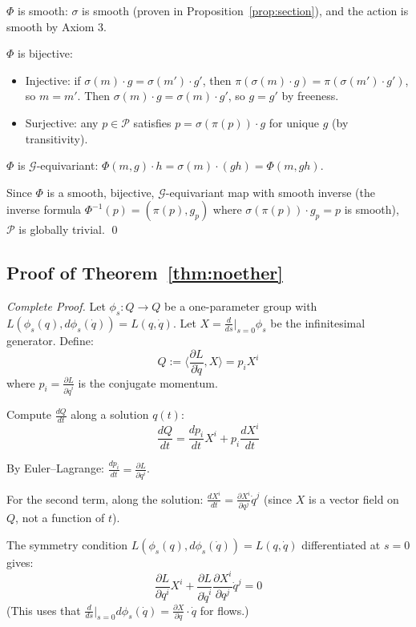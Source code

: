 \documentclass[11pt]{article}
\begin{document}
$\Phi$ is smooth: $\sigma$ is smooth (proven in Proposition~\ref{prop:section}), and the action is smooth by Axiom
3.

$\Phi$ is bijective:
\begin{itemize}
    \item Injective: if $\sigma(m) \cdot g = \sigma(m') \cdot g'$, then $\pi(\sigma(m) \cdot g) = \pi(\sigma(m') \cdot g')$, so $m = m'$. Then $\sigma(m) \cdot g = \sigma(m) \cdot g'$, so $g = g'$ by freeness.
    \item Surjective: any $p \in \mathcal{P}$ satisfies $p = \sigma(\pi(p)) \cdot g$ for unique $g$ (by transitivity).
\end{itemize}

$\Phi$ is $\mathcal{G}$-equivariant: $\Phi(m, g) \cdot h = \sigma(m) \cdot (gh) = \Phi(m, gh)$.

Since $\Phi$ is a smooth, bijective, $\mathcal{G}$-equivariant map with smooth inverse (the inverse formula
$\Phi^{-1}(p) = (\pi(p), g_p)$ where $\sigma(\pi(p)) \cdot g_p = p$ is smooth), $\mathcal{P}$ is globally trivial.
\qed

\subsection{Proof of Theorem~\ref{thm:noether}}

\textit{Complete Proof.} Let $\phi_s : Q \to Q$ be a one-parameter group with $L(\phi_s(q), d\phi_s(\dot{q})) = L(q, \dot{q})$.
Let $X = \frac{d}{ds}|_{s=0}\phi_s$ be the infinitesimal generator. Define:
\[
Q := \langle \frac{\partial L}{\partial \dot{q}}, X \rangle = p_i X^i
\]
where $p_i = \frac{\partial L}{\partial \dot{q}^i}$ is the conjugate momentum.

Compute $\frac{dQ}{dt}$ along a solution $q(t)$:
\[
\frac{dQ}{dt} = \frac{dp_i}{dt} X^i + p_i \frac{dX^i}{dt}
\]

By Euler--Lagrange: $\frac{dp_i}{dt} = \frac{\partial L}{\partial q^i}$.

For the second term, along the solution: $\frac{dX^i}{dt} = \frac{\partial X^i}{\partial q^j}\dot{q}^j$ (since $X$ is a vector field on $Q$, not a
function of $t$).

The symmetry condition $L(\phi_s(q), d\phi_s(\dot{q})) = L(q, \dot{q})$ differentiated at $s = 0$ gives:
\[
\frac{\partial L}{\partial q^i} X^i + \frac{\partial L}{\partial \dot{q}^i}\frac{\partial X^i}{\partial q^j}\dot{q}^j = 0
\]
(This uses that $\frac{d}{ds}|_{s=0} d\phi_s(\dot{q}) = \frac{\partial X}{\partial q} \cdot \dot{q}$ for flows.)
\end{document}
